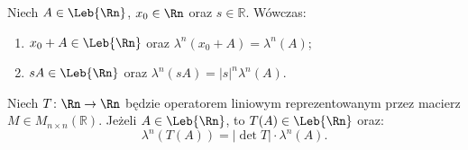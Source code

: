 \begin{tw}
    Niech $A \in \Leb{\Rn}$, $x_0 \in \Rn$ oraz $s \in \mathbb{R}$. Wówczas:
    \begin{enumerate}
        \item $x_0 + A \in \Leb{\Rn}$ oraz $\lambda^n(x_0 + A) = \lambda^n(A)$;
        \item $sA \in \Leb{\Rn}$ oraz $\lambda^n(sA) = |s|^n \lambda^n(A)$.
    \end{enumerate}
\end{tw}

\begin{tw}\label{tw:transformacja_liniowa}
    Niech $T \colon \Rn \to \Rn$ będzie operatorem liniowym reprezentowanym przez macierz $M \in M_{n \times n}(\mathbb{R})$. Jeżeli $A \in \Leb{\Rn}$, to $T(A) \in \Leb{\Rn}$ oraz:
    \begin{equation}
        \lambda^n(T(A)) = |\det T| \cdot \lambda^n(A).
    \end{equation}
\end{tw}

